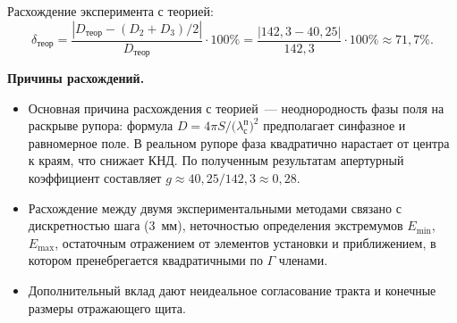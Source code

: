 Расхождение эксперимента с теорией:
\begin{equation}
	\delta_{\text{теор}} = \frac{|D_{\text{теор}} - (D_2 + D_3)/2|}{D_{\text{теор}}} \cdot 100\%
	= \frac{|142{,}3 - 40{,}25|}{142{,}3} \cdot 100\%
	\approx 71{,}7\%.
\end{equation}

\noindent\textbf{Причины расхождений.}
\begin{itemize}
	\item Основная причина расхождения с теорией~--- неоднородность фазы поля на раскрыве рупора: формула $D = 4\pi S/\bigl(\lambda^{\text{п}}_{\text{с}}\bigr)^2$ предполагает синфазное и равномерное поле. В реальном рупоре фаза квадратично нарастает от центра к краям, что снижает КНД. По полученным результатам апертурный коэффициент составляет $g \approx 40{,}25/142{,}3 \approx 0{,}28$.
	\par
	\item Расхождение между двумя экспериментальными методами связано с дискретностью шага ($3$~мм), неточностью определения экстремумов $E_{\min}$, $E_{\max}$, остаточным отражением от элементов установки и приближением, в котором пренебрегается квадратичными по $\Gamma$ членами.
	\item Дополнительный вклад дают неидеальное согласование тракта и конечные размеры отражающего щита.
\end{itemize}
